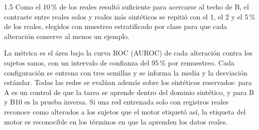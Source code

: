 \begin{spacing}{1.5}
\noindent Como el 10\,\% de los reales resultó suficiente para acercarse al techo de B, el contraste entre reales solos y reales más sintéticos se repitió con el 1, el 2 y el 5\,\% de los reales, elegidos con muestreo estratificado por clase para que cada alteración conserve al menos un ejemplo.

La métrica es el área bajo la curva ROC (AUROC) de cada alteración contra los sujetos sanos, con un intervalo de confianza del 95\,\% por remuestreo. Cada configuración se entrena con tres semillas y se informa la media y la desviación estándar. Todas las redes se evalúan además sobre los sintéticos reservados: para A es un control de que la tarea se aprende dentro del dominio sintético, y para B y B10 es la prueba inversa. Si una red entrenada solo con registros reales reconoce como alterados a los sujetos que el motor etiquetó así, la etiqueta del motor es reconocible en los términos en que la aprenden los datos reales.

\end{spacing}

